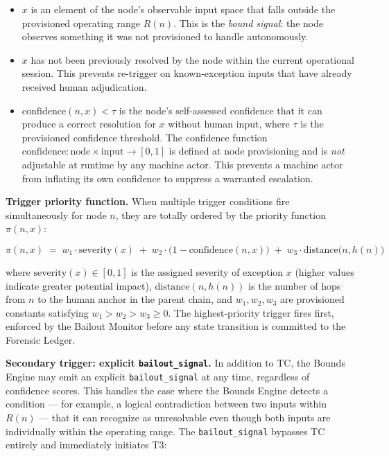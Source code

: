 \begin{itemize}\itemsep=0pt
\item[(i)] $x$ is an element of the node's observable input space that falls outside the provisioned operating range $R(n)$. This is the \emph{bound signal}: the node observes something it was not provisioned to handle autonomously.

\item[(ii)] $x$ has not been previously resolved by the node within the current operational session. This prevents re-trigger on known-exception inputs that have already received human adjudication.

\item[(iii)] $\text{confidence}(n, x) < \tau$ is the node's self-assessed confidence that it can produce a correct resolution for $x$ without human input, where $\tau$ is the provisioned confidence threshold. The confidence function $\text{confidence} : \text{node} \times \text{input} \rightarrow [0, 1]$ is defined at node provisioning and is \emph{not} adjustable at runtime by any machine actor. This prevents a machine actor from inflating its own confidence to suppress a warranted escalation.
\end{itemize}

\bigskip
\noindent\textbf{Trigger priority function.} When multiple trigger conditions fire simultaneously for node $n$, they are totally ordered by the priority function $\pi(n, x)$:

\begin{equation}
\pi(n, x) \;=\; w_1 \cdot \text{severity}(x) \;+\; w_2 \cdot \bigl(1 - \text{confidence}(n, x)\bigr) \;+\; w_3 \cdot \text{distance}\bigl(n, h(n)\bigr) \tag{PF}
\end{equation}

where $\text{severity}(x) \in [0, 1]$ is the assigned severity of exception $x$ (higher values indicate greater potential impact), $\text{distance}(n, h(n))$ is the number of hops from $n$ to the human anchor in the parent chain, and $w_1, w_2, w_3$ are provisioned constants satisfying $w_1 > w_2 > w_3 \geq 0$. The highest-priority trigger fires first, enforced by the Bailout Monitor before any state transition is committed to the Forensic Ledger.

\bigskip
\noindent\textbf{Secondary trigger: explicit \texttt{bailout\_signal}.} In addition to TC, the Bounds Engine may emit an explicit \texttt{bailout\_signal} at any time, regardless of confidence scores. This handles the case where the Bounds Engine detects a condition — for example, a logical contradiction between two inputs within $R(n)$ — that it can recognize as unresolvable even though both inputs are individually within the operating range. The \texttt{bailout\_signal} bypasses TC entirely and immediately initiates T3:

